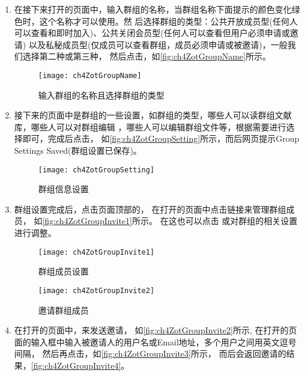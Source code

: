 \documentclass[cn,11pt,chinese]{elegantbook}
\begin{document}
\begin{enumerate}
	\item 在接下来打开的页面中，输入群组的名称，当群组名称下面提示的颜色变化绿色时，这个名称才可以使用。然
	后选择群组的类型：公共开放成员型(任何人可以查看和即时加入)、公共关闭会员型(任何人可以查看但用户必须申请或邀请)
	以及私秘成员型(仅成员可以查看群组，成员必须申请或被邀请)，一般我们选择第二种或第三种，
	然后点击，如\autoref{fig:ch4ZotGroupName}所示。
	\begin{figure}[htbp]
		\centering
		\texttt{[image: ch4ZotGroupName]}
		\caption{输入群组的名称且选择群组的类型}
		\label{fig:ch4ZotGroupName}
	\end{figure}
	\item 接下来的页面中是群组的一些设置，如群组的类型，哪些人可以读群组文献库，哪些人可以对群组编辑
	，哪些人可以编辑群组文件等，根据需要进行选择即可，完成后点击，
	如\autoref{fig:ch4ZotGroupSetting}所示，而后网页提示Group Settings Saved(群组设置已保存)。
	\begin{figure}[htbp]
		\centering
		\texttt{[image: ch4ZotGroupSetting]}
		\caption{群组信息设置}
		\label{fig:ch4ZotGroupSetting}
	\end{figure}
	\item 群组设置完成后，点击页面顶部的，
	在打开的页面中点击链接来管理群组成员，
	如\autoref{fig:ch4ZotGroupInvite1}所示。
	在这也可以点击
	或对群组的相关设置进行调整。
	\begin{figure}[htbp]
		\centering
		\begin{minipage}[t]{\dimexpr.5\textwidth-1em}
			\centering
			\texttt{[image: ch4ZotGroupInvite1]}
			\caption{群组成员设置}
			\label{fig:ch4ZotGroupInvite1}
		\end{minipage}
		\begin{minipage}[t]{\dimexpr.5\textwidth-1em}
			\centering
			\texttt{[image: ch4ZotGroupInvite2]}
			\caption{邀请群组成员}
			\label{fig:ch4ZotGroupInvite2}	
		\end{minipage}	 
	\end{figure}
	\item 在打开的页面中，来发送邀请，
	如\autoref{fig:ch4ZotGroupInvite2}所示,
	在打开的页面的输入框中输入被邀请人的用户名或Email地址，多个用户之间用英文逗号间隔，
	然后再点击，如\autoref{fig:ch4ZotGroupInvite3}所示，
	而后会返回邀请的结果，\autoref{fig:ch4ZotGroupInvite4}。

\end{enumerate}
\end{document}
